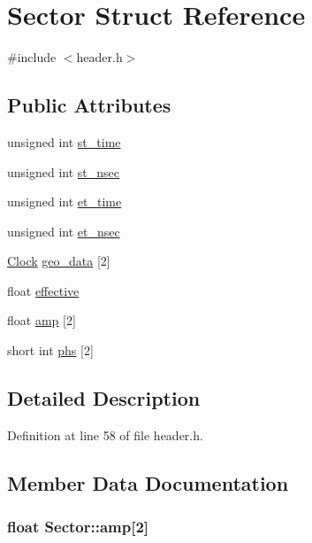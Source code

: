 \hypertarget{structSector}{
\section{Sector Struct Reference}
\label{structSector}
}


{\ttfamily \#include $<$header.h$>$}\subsection*{Public Attributes}
\begin{DoxyCompactItemize}
\item 
unsigned int \hyperlink{structSector_a458764b8477c5ec16e14ff14859fb32a}{st\_\-time}
\item 
unsigned int \hyperlink{structSector_a72c3039773213b2bac9be3c2084e6c1c}{st\_\-nsec}
\item 
unsigned int \hyperlink{structSector_aec5d4f9bb6f5c758e8cb7352ad709877}{et\_\-time}
\item 
unsigned int \hyperlink{structSector_ab7448a02f911a225f1f59fdd418b5d51}{et\_\-nsec}
\item 
\hyperlink{structClock}{Clock} \hyperlink{structSector_a11562260b4d531715bd3d1b7349b58be}{geo\_\-data} \mbox{[}2\mbox{]}
\item 
float \hyperlink{structSector_a238bb7d9c9c014f78f2fe414c2d29682}{effective}
\item 
float \hyperlink{structSector_a40a3a8db6742acdbb37ad76fab9afd70}{amp} \mbox{[}2\mbox{]}
\item 
short int \hyperlink{structSector_abca4d958bc9375efad849c623aaf9e19}{phs} \mbox{[}2\mbox{]}
\end{DoxyCompactItemize}


\subsection{Detailed Description}


Definition at line 58 of file header.h.

\subsection{Member Data Documentation}
\hypertarget{structSector_a40a3a8db6742acdbb37ad76fab9afd70}{
\subsubsection[{amp}]{\setlength{\rightskip}{0pt plus 5cm}float {\bf Sector::amp}\mbox{[}2\mbox{]}}}
\label{structSector_a40a3a8db6742acdbb37ad76fab9afd70}


